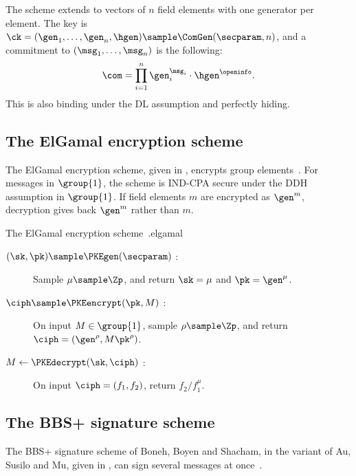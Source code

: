 The scheme extends to vectors of $n$ field elements with one generator per
element. The key is $\ck = (\gen_1, \ldots, \gen_n, \hgen) \sample
\ComGen(\secparam, n)$, and a commitment to $(\msg_1, \ldots, \msg_n)$ is the
following:
%
\begin{equation*}
  \com = \prod_{i=1}^{n} \gen_i^{\msg_i} \cdot \hgen^{\openinfo}.
\end{equation*}
%
This is also binding under the DL assumption and perfectly hiding.

\subsection{The ElGamal encryption scheme}

The ElGamal encryption scheme, given in , encrypts group
elements~\cite{C:ElGamal84}. For messages in $\group{1}$, the scheme is IND-CPA
secure under the DDH assumption in $\group{1}$. If field elements $m$ are
encrypted as $\gen^m$, decryption gives back $\gen^m$ rather than $m$.

\begin{primitivebox}{The ElGamal encryption scheme~\cite{C:ElGamal84}.}{elgamal}

  \begin{description}

    \item[$(\sk, \pk) \sample \PKEgen(\secparam)$ :] Sample $\mu \sample \Zp$,
and return $\sk = \mu$ and $\pk = \gen^{\mu}$.

    \item[$\ciph \sample \PKEencrypt(\pk, M)$ :] On input $M \in \group{1}$,
sample $\rho \sample \Zp$, and return $\ciph = (\gen^{\rho}, M \pk^{\rho})$.

    \item[$M \leftarrow \PKEdecrypt(\sk, \ciph)$ :] On input $\ciph = (f_1, f_2)$,
return $f_2 / f_1^{\mu}$.

  \end{description}

\end{primitivebox}

\subsection{The BBS+ signature scheme}\label{sec:prelims-bbs}

The BBS+ signature scheme of Boneh, Boyen and Shacham, in the variant of Au,
Susilo and Mu, given in , can sign several messages at
once~\cite{C:BonBoySha04,SCN:AuSusMu06}.

